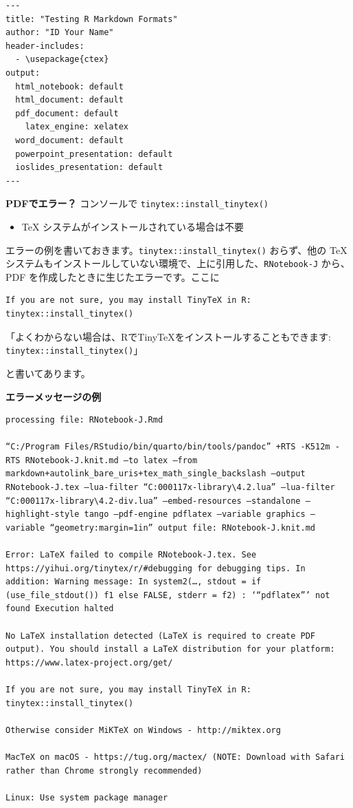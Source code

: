 \documentclass[
  xelatex, ja=standard]{bxjsbook}
\providecommand{\tightlist}{%
  \setlength{\itemsep}{0pt}\setlength{\parskip}{0pt}}
\theoremstyle{definition}
\theoremstyle{definition}
\theoremstyle{definition}
\theoremstyle{definition}
\theoremstyle{remark}
\begin{document}
\begin{verbatim}
---
title: "Testing R Markdown Formats"
author: "ID Your Name"
header-includes:
  - \usepackage{ctex}
output:
  html_notebook: default
  html_document: default
  pdf_document: default
    latex_engine: xelatex
  word_document: default
  powerpoint_presentation: default
  ioslides_presentation: default
---
\end{verbatim}

\textbf{PDFでエラー？} コンソールで \texttt{tinytex::install\_tinytex()}

\begin{itemize}
\tightlist
\item
  TeX システムがインストールされている場合は不要
\end{itemize}

エラーの例を書いておきます。\texttt{tinytex::install\_tinytex()} おらず、他の TeX システムもインストールしていない環境で、上に引用した、\texttt{RNotebook-J} から、PDF を作成したときに生じたエラーです。ここに

\begin{verbatim}
If you are not sure, you may install TinyTeX in R: tinytex::install_tinytex()
\end{verbatim}

「よくわからない場合は、RでTinyTeXをインストールすることもできます: \texttt{tinytex::install\_tinytex()}」

と書いてあります。

\textbf{エラーメッセージの例}

\begin{verbatim}
processing file: RNotebook-J.Rmd

“C:/Program Files/RStudio/bin/quarto/bin/tools/pandoc” +RTS -K512m -RTS RNotebook-J.knit.md –to latex –from markdown+autolink_bare_uris+tex_math_single_backslash –output RNotebook-J.tex –lua-filter “C:000117x-library\4.2.lua” –lua-filter “C:000117x-library\4.2-div.lua” –embed-resources –standalone –highlight-style tango –pdf-engine pdflatex –variable graphics –variable “geometry:margin=1in” output file: RNotebook-J.knit.md

Error: LaTeX failed to compile RNotebook-J.tex. See https://yihui.org/tinytex/r/#debugging for debugging tips. In addition: Warning message: In system2(…, stdout = if (use_file_stdout()) f1 else FALSE, stderr = f2) : ‘“pdflatex”’ not found Execution halted

No LaTeX installation detected (LaTeX is required to create PDF output). You should install a LaTeX distribution for your platform: https://www.latex-project.org/get/

If you are not sure, you may install TinyTeX in R: tinytex::install_tinytex()

Otherwise consider MiKTeX on Windows - http://miktex.org

MacTeX on macOS - https://tug.org/mactex/ (NOTE: Download with Safari rather than Chrome strongly recommended)

Linux: Use system package manager
\end{verbatim}
\end{document}
